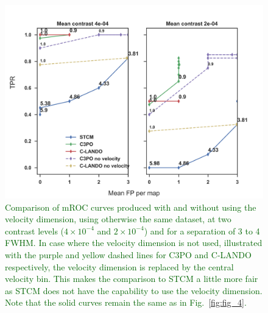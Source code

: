 \documentclass{aa}
\newcommand{\newchange}[1]{\textcolor{darkgreen}{#1}}
\begin{document}
\begin{figure}
    \centering
    \includegraphics[width=\textwidth]{Fig6_April2024_referee.png}
    \caption{\newchange{Comparison of mROC curves produced with and without using the velocity dimension, using otherwise the same dataset, at two contrast levels ($4\times 10^{-4}$ and $2\times 10^{-4}$) and for a separation of 3 to 4 FWHM. In case where the velocity dimension is not used, illustrated with the purple and yellow dashed lines for C3PO and C-LANDO respectively, the velocity dimension is replaced by the central velocity bin. This makes the comparison to STCM a little more fair as STCM does not have the capability to use the velocity dimension.
    Note that the solid curves remain the same as in Fig.~\ref{fig:fig_4}.}
    }
    \label{fig:novel_roc}
\end{figure}
\end{document}
